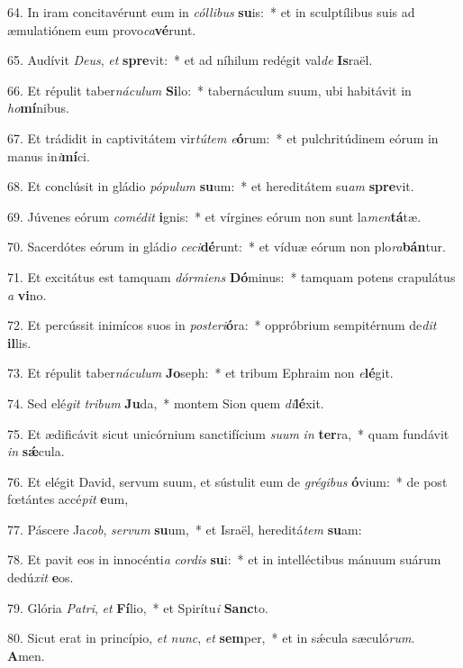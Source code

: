 64. In iram concitavérunt eum in \textit{cól}\textit{li}\textit{bus} \textbf{su}is:~*  et in sculptílibus suis ad æmulatiónem eum provo\textit{ca}\textbf{vé}runt.\

65. Audívit \textit{De}\textit{us}, \textit{et} \textbf{spre}vit:~*  et ad níhilum redégit val\textit{de} \textbf{Is}raël.\

66. Et répulit taber\textit{ná}\textit{cu}\textit{lum} \textbf{Si}lo:~*  tabernáculum suum, ubi habitávit in \textit{ho}\textbf{mí}nibus.\

67. Et trádidit in captivitátem vir\textit{tú}\textit{tem} \textit{e}\textbf{ó}rum:~*  et pulchritúdinem eórum in manus in\textit{i}\textbf{mí}ci.\

68. Et conclúsit in gládio \textit{pó}\textit{pu}\textit{lum} \textbf{su}um:~*  et hereditátem su\textit{am} \textbf{spre}vit.\

69. Júvenes eórum \textit{com}\textit{é}\textit{dit} \textbf{i}gnis:~*  et vírgines eórum non sunt la\textit{men}\textbf{tá}tæ.\

70. Sacerdótes eórum in gládi\textit{o} \textit{ce}\textit{ci}\textbf{dé}runt:~*  et víduæ eórum non plo\textit{ra}\textbf{bán}tur.\

71. Et excitátus est tamquam \textit{dór}\textit{mi}\textit{ens} \textbf{Dó}minus:~*  tamquam potens crapulátus \textit{a} \textbf{vi}no.\

72. Et percússit inimícos suos in \textit{post}\textit{e}\textit{ri}\textbf{ó}ra:~*  oppróbrium sempitérnum de\textit{dit} \textbf{il}lis.\

73. Et répulit taber\textit{ná}\textit{cu}\textit{lum} \textbf{Jo}seph:~*  et tribum Ephraim non \textit{e}\textbf{lé}git.\

74. Sed elé\textit{git} \textit{tri}\textit{bum} \textbf{Ju}da,~*  montem Sion quem \textit{di}\textbf{lé}xit.\

75. Et ædificávit sicut unicórnium sanctifícium \textit{su}\textit{um} \textit{in} \textbf{ter}ra,~*  quam fundávit \textit{in} \textbf{sǽ}cula.\

76. Et elégit David, servum suum, et sústulit eum de \textit{gré}\textit{gi}\textit{bus} \textbf{ó}vium:~*  de post fœtántes accé\textit{pit} \textbf{e}um,\

77. Páscere Ja\textit{cob}, \textit{ser}\textit{vum} \textbf{su}um,~*  et Israël, hereditá\textit{tem} \textbf{su}am:\

78. Et pavit eos in innocénti\textit{a} \textit{cor}\textit{dis} \textbf{su}i:~*  et in intelléctibus mánuum suárum dedú\textit{xit} \textbf{e}os.\

79. Glória \textit{Pa}\textit{tri}, \textit{et} \textbf{Fí}lio,~*  et Spirítu\textit{i} \textbf{Sanc}to.\

80. Sicut erat in princípio, \textit{et} \textit{nunc}, \textit{et} \textbf{sem}per,~*  et in sǽcula sæculó\textit{rum}. \textbf{A}men.\

